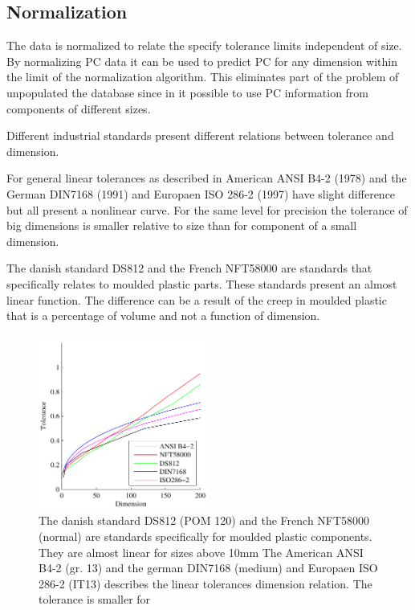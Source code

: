\documentclass[aip,amsmath, reprint, author-year]{revtex4-1}
\begin{document}
\subsection{Normalization}

The data is normalized to relate the specify tolerance limits independent of size. By normalizing PC data it can be used to predict PC for any dimension within the limit of the normalization algorithm. 
This eliminates part of the problem of unpopulated the database since in it possible to use PC information from components of different sizes.

Different industrial standards present different relations between tolerance and dimension. 

For general linear tolerances as described in American ANSI B4-2 (1978) and the German DIN7168 (1991) and Europaen ISO 286-2 (1997) have slight difference but all present a nonlinear curve. For the same level for precision the tolerance of big dimensions is smaller relative to size than for component of a small dimension.

The danish standard DS812 and the French NFT58000 are standards that specifically relates to moulded plastic parts. These standards present an almost linear function. The difference can be a result of the creep in moulded plastic that is a percentage of volume and not a function of dimension.


\begin{figure}
\includegraphics[width=0.5\textwidth]{Tolerance_standards.pdf}
\caption{\label{fig:tolstd} The danish standard DS812 (POM 120) and the French NFT58000 (normal) are standards specifically for moulded plastic components. They are almost linear for sizes above 10mm The American ANSI B4-2 (gr. 13) and the german DIN7168 (medium) and Europaen ISO 286-2 (IT13) describes the linear tolerances dimension relation. The tolerance is smaller for }
\end{figure}
\end{document}
